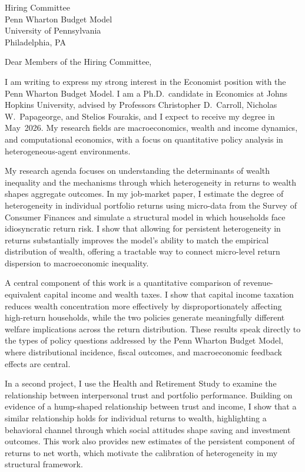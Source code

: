 \documentclass[11pt,letterpaper]{letter}
\begin{document}
\begin{letter}{
Hiring Committee \\
Penn Wharton Budget Model \\
University of Pennsylvania \\
Philadelphia, PA
}

\opening{Dear Members of the Hiring Committee,}

I am writing to express my strong interest in the Economist position with the Penn Wharton Budget Model. I am a Ph.D.\ candidate in Economics at Johns Hopkins University, advised by Professors Christopher D.~Carroll, Nicholas W.~Papageorge, and Stelios Fourakis, and I expect to receive my degree in May~2026. My research fields are macroeconomics, wealth and income dynamics, and computational economics, with a focus on quantitative policy analysis in heterogeneous-agent environments.

My research agenda focuses on understanding the determinants of wealth inequality and the mechanisms through which heterogeneity in returns to wealth shapes aggregate outcomes. In my job-market paper, I estimate the degree of heterogeneity in individual portfolio returns using micro-data from the Survey of Consumer Finances and simulate a structural model in which households face idiosyncratic return risk. I show that allowing for persistent heterogeneity in returns substantially improves the model’s ability to match the empirical distribution of wealth, offering a tractable way to connect micro-level return dispersion to macroeconomic inequality.

A central component of this work is a quantitative comparison of revenue-equivalent capital income and wealth taxes. I show that capital income taxation reduces wealth concentration more effectively by disproportionately affecting high-return households, while the two policies generate meaningfully different welfare implications across the return distribution. These results speak directly to the types of policy questions addressed by the Penn Wharton Budget Model, where distributional incidence, fiscal outcomes, and macroeconomic feedback effects are central.

In a second project, I use the Health and Retirement Study to examine the relationship between interpersonal trust and portfolio performance. Building on evidence of a hump-shaped relationship between trust and income, I show that a similar relationship holds for individual returns to wealth, highlighting a behavioral channel through which social attitudes shape saving and investment outcomes. This work also provides new estimates of the persistent component of returns to net worth, which motivate the calibration of heterogeneity in my structural framework.


\end{letter}
\end{document}
